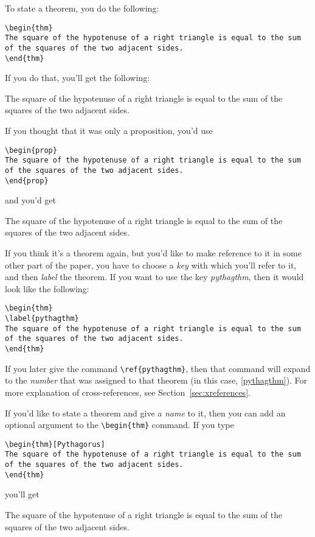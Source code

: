To state a theorem, you do the following:
\begin{verbatim}
\begin{thm}
The square of the hypotenuse of a right triangle is equal to the sum
of the squares of the two adjacent sides.
\end{thm}
\end{verbatim}
If you do that, you'll get the following:
\begin{thm}
\label{pythagthm}
The square of the hypotenuse of a right triangle is equal to the sum
of the squares of the two adjacent sides.
\end{thm}
If you thought that it was only a proposition, you'd use
\begin{verbatim}
\begin{prop}
The square of the hypotenuse of a right triangle is equal to the sum
of the squares of the two adjacent sides.
\end{prop}
\end{verbatim}
and you'd get
\begin{prop}
The square of the hypotenuse of a right triangle is equal to the sum
of the squares of the two adjacent sides.
\end{prop}

If you think it's a theorem again, but you'd like to make reference
to it in some other part of the paper, you have to choose a {\em
key\/} with which you'll refer to it, and then {\em label\/} the
theorem.  If you want to use the key {\em pythagthm}, then it would
look like the following:
\begin{verbatim}
\begin{thm}
\label{pythagthm}
The square of the hypotenuse of a right triangle is equal to the sum
of the squares of the two adjacent sides.
\end{thm}
\end{verbatim}
If you later give the command \verb"\ref{pythagthm}", then that
command will expand to the {\em number\/} that was assigned to that
theorem (in this case, \ref{pythagthm}).  For more explanation of
cross-references, see Section~\ref{sec:xreferences}.

If you'd like to state a theorem and give a {\em name\/} to it, then
you can add an optional argument to the \verb"\begin{thm}" command.
If you type
\begin{verbatim}
\begin{thm}[Pythagorus]
The square of the hypotenuse of a right triangle is equal to the sum
of the squares of the two adjacent sides.
\end{thm}
\end{verbatim}
you'll get
\begin{thm}[Pythagorus]
The square of the hypotenuse of a right triangle is equal to the sum
of the squares of the two adjacent sides.
\end{thm}


